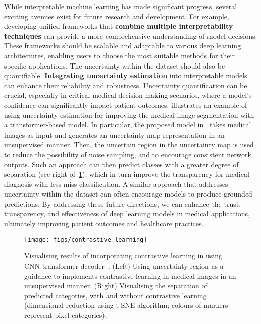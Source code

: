 \documentclass[dvipsnames]{article}
\renewcommand{\cite}[1]{\autocite{#1}}
\begin{document}
While interpretable machine learning has made significant progress, several exciting avenues exist for future research and development.
For example, developing unified frameworks that \textbf{combine multiple interpretability techniques} can provide a more comprehensive understanding of model decisions. These frameworks should be scalable and adaptable to various deep learning architectures, enabling users to choose the most suitable methods for their specific applications.
The uncertainty within the dataset should also be quantifiable.
\textbf{Integrating uncertainty estimation} into interpretable models can enhance their reliability and robustness. Uncertainty quantification can be crucial, especially in critical medical decision-making scenarios, where a model's confidence can significantly impact patient outcomes.
 illustrates an example of using uncertainty estimation for improving the medical image segmentation with a transformer-based model.
In particular, the proposed model in~\cite{wang2022uncertainty} takes medical images as input and generates an uncertainty map representation in an unsupervised manner.
Then, the uncertain region in the uncertainty map is used to reduce the possibility of noise sampling, and to encourage consistent network outputs.
Such an approach can then predict classes with a greater degree of separation (see right of~\cref{fig:contrastive-learning}), which in turn improve the transparency for medical diagnosis with less miss-classification.
A similar approach that addresses uncertainty within the dataset can often encourage models to produce grounded predictions.
By addressing these future directions, we can enhance the trust, transparency, and effectiveness of deep learning models in medical applications, ultimately improving patient outcomes and healthcare practices.








\begin{figure}[tb]
	\centering
	\texttt{[image: figs/contrastive-learning]}
	\caption{\label{fig:contrastive-learning}
        Visualising results of incorporating contrastive learning in using CNN-transformer decoder~\cite{wang2022uncertainty}.
        (Left) Using uncertainty region as a guidance to implements contrastive learning in medical images in an unsupervised manner.
        (Right) Visualising the separation of predicted categories, with and without contrastive learning (dimensional reduction using t-SNE algorithm; colours of markers represent pixel categories).
    }
\end{figure}





\printbibliography
\end{document}
